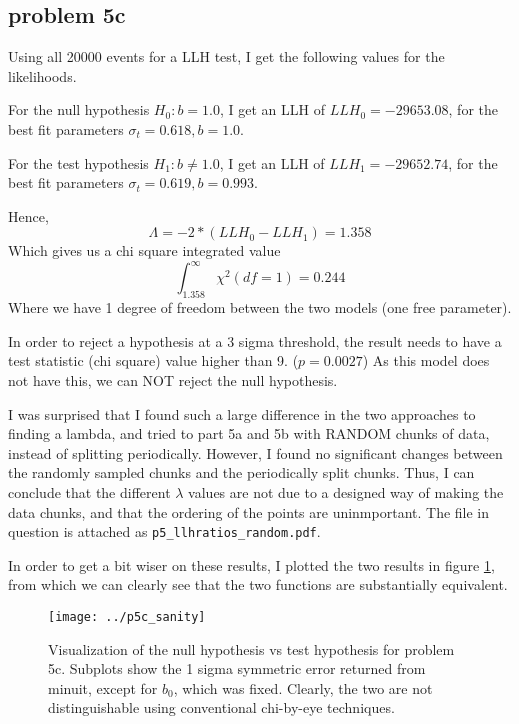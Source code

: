 \documentclass[a4paper,11pt]{article}
\begin{document}
\subsection{problem 5c }
Using all 20000 events for a LLH test, I get the following values for the likelihoods.

For the null hypothesis \( H_0 : b = 1.0 \), I get an LLH of \(LLH_0 = -29653.08\), for the best fit parameters \(\sigma_t = 0.618, b = 1.0  \).

For the test hypothesis \( H_1 : b \neq 1.0 \), I get an LLH of \(LLH_1 = -29652.74\), for the best fit parameters \(\sigma_t = 0.619, b = 0.993 \).

Hence,
\[
\Lambda = -2 * ( LLH_0 - LLH_1 ) = 1.358
\]
Which gives us a chi square integrated value \[\int_{1.358}^{\infty}\chi^2(df= 1) = 0.244\]
Where we have 1 degree of freedom between the two models (one free parameter).

In order to reject a hypothesis at a 3 sigma threshold, the result needs to have a test statistic (chi square) value higher than 9. ($p = 0.0027$)
As this model does not have this, we can NOT reject the null hypothesis.

I was surprised that I found such a large difference in the two approaches to finding a lambda, and tried to part 5a and 5b with RANDOM chunks of data, instead of splitting periodically.
However, I found no significant changes between the randomly sampled chunks and the periodically split chunks.
Thus, I can conclude that the different $\lambda$ values are not due to a designed way of making the data chunks, and that the ordering of the points are uninmportant.
The file in question is attached as \verb|p5_llhratios_random.pdf|.

In order to get a bit wiser on these results, I plotted the two results in figure \ref{p5_sanit}, from which we can clearly see that the two functions are substantially equivalent.
\begin{figure}
  \texttt{[image: ../p5c\_sanity]}
  \caption{Visualization of the null hypothesis vs test hypothesis for problem 5c. Subplots show the 1 sigma symmetric error returned from minuit, except for $b_0$, which was fixed.
  Clearly, the two are not distinguishable using conventional chi-by-eye techniques. }
  \label{p5_sanit}
\end{figure}
\end{document}
